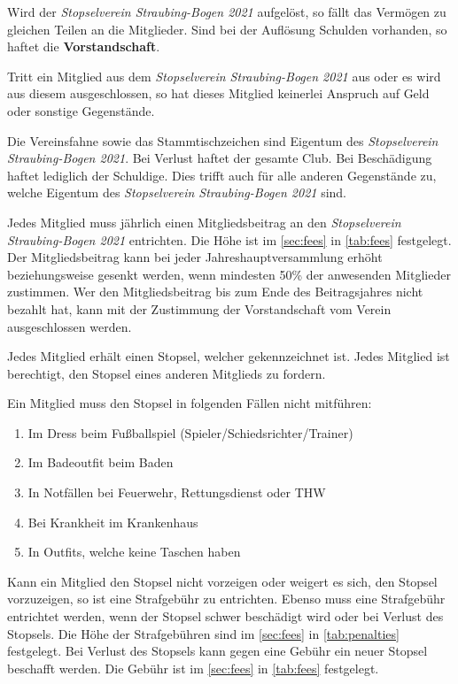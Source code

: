 \documentclass[a4paper,12pt]{scrartcl}
\newcommand{\vereinsName}{Stopselverein Straubing-Bogen 2021}
\begin{document}
    Wird der \emph{\vereinsName} aufgelöst, so fällt das Vermögen zu gleichen Teilen an die Mitglieder.
    Sind bei der Auflösung Schulden vorhanden, so haftet die \textbf{Vorstandschaft}.

    Tritt ein Mitglied aus dem \emph{\vereinsName} aus oder es wird aus diesem ausgeschlossen,
    so hat dieses Mitglied keinerlei Anspruch auf Geld oder sonstige Gegenstände.

    Die Vereinsfahne sowie das Stammtischzeichen sind Eigentum des \emph{\vereinsName}.
    Bei Verlust haftet der gesamte Club.
    Bei Beschädigung haftet lediglich der Schuldige.
    Dies trifft auch für alle anderen Gegenstände zu, welche Eigentum des \emph{\vereinsName} sind.

    Jedes Mitglied muss jährlich einen Mitgliedsbeitrag an den \emph{\vereinsName} entrichten.
    Die Höhe ist im \autoref{sec:fees} in \autoref{tab:fees} festgelegt.
    Der Mitgliedsbeitrag kann bei jeder Jahreshauptversammlung erhöht beziehungsweise gesenkt werden,
    wenn mindesten 50\% der anwesenden Mitglieder zustimmen.
    Wer den Mitgliedsbeitrag bis zum Ende des Beitragsjahres nicht bezahlt hat,
    kann mit der Zustimmung der Vorstandschaft vom Verein ausgeschlossen werden.

    Jedes Mitglied erhält einen Stopsel, welcher gekennzeichnet ist.
    Jedes Mitglied ist berechtigt, den Stopsel eines anderen Mitglieds zu fordern.

    Ein Mitglied muss den Stopsel in folgenden Fällen nicht mitführen:
    \begin{enumerate}
        \item Im Dress beim Fußballspiel (Spieler/Schiedsrichter/Trainer)
        \item Im Badeoutfit beim Baden
        \item In Notfällen bei Feuerwehr, Rettungsdienst oder THW
        \item Bei Krankheit im Krankenhaus
        \item In Outfits, welche keine Taschen haben
    \end{enumerate}

    Kann ein Mitglied den Stopsel nicht vorzeigen oder weigert es sich,
    den Stopsel vorzuzeigen, so ist eine Strafgebühr zu entrichten.
    Ebenso muss eine Strafgebühr entrichtet werden, wenn der Stopsel schwer beschädigt wird
    oder bei Verlust des Stopsels.
    Die Höhe der Strafgebühren sind im \autoref{sec:fees} in \autoref{tab:penalties} festgelegt.
    Bei Verlust des Stopsels kann gegen eine Gebühr ein neuer Stopsel beschafft werden.
    Die Gebühr ist im \autoref{sec:fees} in \autoref{tab:fees} festgelegt.
\end{document}
